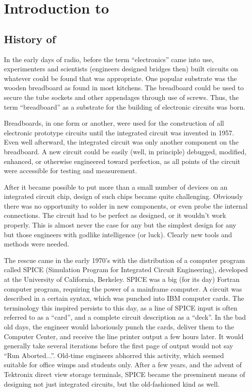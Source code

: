 
\chapter{Introduction to {\WRspice}}

\section{History of {\WRspice}}


In the early days of radio, before the term ``electronics'' came into
use, experimenters and scientists (engineers designed bridges then)
built circuits on whatever could be found that was appropriate.  One
popular substrate was the wooden breadboard as found in most kitchens. 
The breadboard could be used to secure the tube sockets and other
appendages through use of screws.  Thus, the term ``breadboard'' as a
substrate for the building of electronic circuits was born.

Breadboards, in one form or another, were used for the construction of
all electronic prototype circuits until the integrated circuit was
invented in 1957.  Even well afterward, the integrated circuit was
only another component on the breadboard.  A new circuit could be
easily (well, in principle) debugged, modified, enhanced, or otherwise
engineered toward perfection, as all points of the circuit were
accessible for testing and measurement.

After it became possible to put more than a small number of devices on
an integrated circuit chip, design of such chips became quite
challenging.  Obviously there was no opportunity to solder in new
components, or even probe the internal connections.  The circuit had
to be perfect as designed, or it wouldn't work properly.  This is
almost never the case for any but the simplest design for any but
those engineers with godlike intelligence (or luck).  Clearly new
tools and methods were needed.

The rescue came in the early 1970's with the distribution of a
computer program called SPICE (Simulation Program for Integrated
Circuit Engineering), developed at the University of California,
Berkeley.  SPICE was a big (for its day) Fortran computer program,
requiring the power of a mainframe computer.  A circuit was described
in a certain syntax, which was punched into IBM computer cards.  The
terminology this inspired persists to this day, as a line of SPICE
input is often referred to as a ``card'', and a complete circuit
description as a ``deck''.  In the bad old days, the engineer would
laboriously punch the cards, deliver them to the Computer Center, and
receive the line printer output a few hours later.  It would generally
take several iterations before the first page of output would not
say ``Run Aborted...''.  Old-time engineers abhorred this activity,
which seemed suitable for office wimps and students only.  After a few
years, and the advent of Tektronix direct view storage terminals,
SPICE became the preeminent means of designing not just integrated
circuits, but the old-fashioned kind as well.

